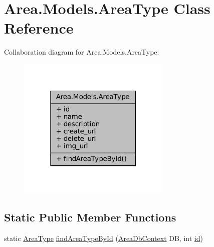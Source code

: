 \hypertarget{classArea_1_1Models_1_1AreaType}{}\section{Area.\+Models.\+Area\+Type Class Reference}
\label{classArea_1_1Models_1_1AreaType}


Collaboration diagram for Area.\+Models.\+Area\+Type\+:
\nopagebreak
\begin{figure}[H]
\begin{center}
\leavevmode
\includegraphics[width=207pt]{classArea_1_1Models_1_1AreaType__coll__graph}
\end{center}
\end{figure}
\subsection*{Static Public Member Functions}
\begin{DoxyCompactItemize}
\item 
static \mbox{\hyperlink{classArea_1_1Models_1_1AreaType}{Area\+Type}} \mbox{\hyperlink{classArea_1_1Models_1_1AreaType_a06f11a87a3ffb86fe075d5db4bba48b2}{find\+Area\+Type\+By\+Id}} (\mbox{\hyperlink{classArea_1_1DAT_1_1AreaDbContext}{Area\+Db\+Context}} DB, int \mbox{\hyperlink{classArea_1_1Models_1_1AreaType_a334470e1882a0d27aad7dc0a180e5b0b}{id}})
\end{DoxyCompactItemize}
